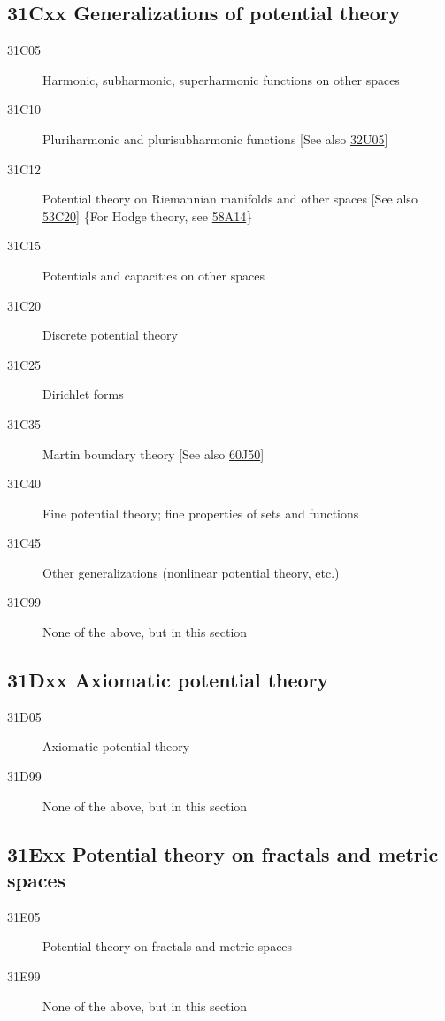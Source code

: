 \subsection*{31Cxx  Generalizations of potential theory }\label{31Cxx}
\begin{description}  
\item [31C05]\label{31C05} Harmonic, subharmonic, superharmonic functions on other spaces
\item [31C10]\label{31C10} Pluriharmonic and plurisubharmonic functions [See also \hyperref[32U05]{32U05}]
\item [31C12]\label{31C12} Potential theory on Riemannian manifolds and other spaces [See also \hyperref[53C20]{53C20}] \{For Hodge theory, see \hyperref[58A14]{58A14}\}
\item [31C15]\label{31C15} Potentials and capacities on other spaces
\item [31C20]\label{31C20} Discrete potential theory
\item [31C25]\label{31C25} Dirichlet forms
\item [31C35]\label{31C35} Martin boundary theory [See also \hyperref[60J50]{60J50}]
\item [31C40]\label{31C40} Fine potential theory; fine properties of sets and functions
\item [31C45]\label{31C45} Other generalizations (nonlinear potential theory, etc.)
\item [31C99]\label{31C99} None of the above, but in this section
\end{description}
\subsection*{31Dxx  Axiomatic potential theory }\label{31Dxx}
\begin{description}  
\item [31D05]\label{31D05} Axiomatic potential theory
\item [31D99]\label{31D99} None of the above, but in this section
\end{description}
\subsection*{31Exx  Potential theory on fractals and metric spaces }\label{31Exx}
\begin{description}  
\item [31E05]\label{31E05} Potential theory on fractals and metric spaces
\item [31E99]\label{31E99} None of the above, but in this section
\end{description}
